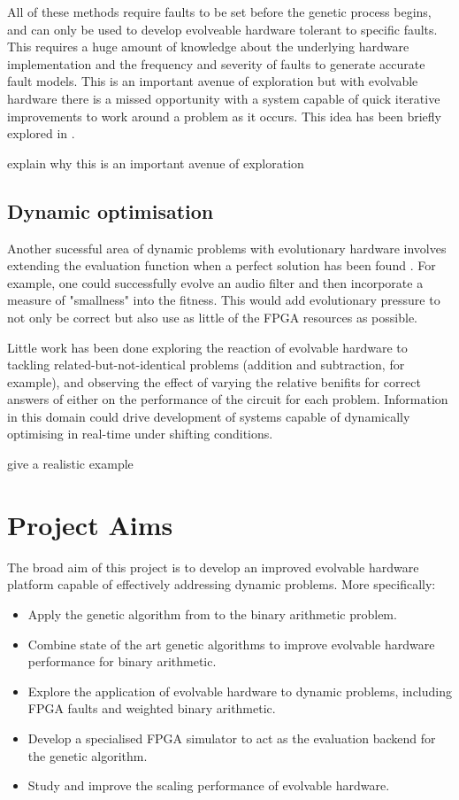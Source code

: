 All of these methods require faults to be set before the genetic process begins, and can only be used to
develop evolveable hardware tolerant to specific faults. This requires a huge amount of knowledge
about the underlying hardware implementation and the frequency and severity of faults to generate
accurate fault models. This
is an important avenue of exploration but with evolvable hardware there is a missed
opportunity with a system capable of quick iterative improvements to work around
a problem as it occurs. This idea has been briefly explored in \cite{10.1007/3-540-61093-6_6}.

\todo explain why this is an important avenue of exploration

\subsection{Dynamic optimisation}
Another sucessful area of dynamic problems with evolutionary hardware involves
extending the evaluation function when a perfect solution has been found \cite{785435}. For example,
one could successfully evolve an audio filter and then incorporate a measure of "smallness"
into the fitness. This would add evolutionary pressure to not only be correct but also
use as little of the FPGA resources as possible.

Little work has been done exploring the reaction of evolvable hardware to tackling
related-but-not-identical problems (addition and subtraction, for example), and observing
the effect of varying
the relative benifits for correct answers of either on the performance of the circuit for each problem.
Information in this domain could
drive development of systems capable of dynamically optimising in real-time
under shifting conditions.

\todo give a realistic example

\section{Project Aims}

The broad aim of this project is to develop an improved evolvable hardware
platform capable of effectively addressing dynamic problems. More specifically:
\begin{itemize}
	\item Apply the genetic algorithm from \cite{10.1007/3-540-63173-9_61} to
		the binary arithmetic problem.
	\item Combine state of the art genetic algorithms to improve
		evolvable hardware performance for binary arithmetic.
	\item Explore the application of evolvable hardware to dynamic
		problems, including FPGA faults and weighted binary arithmetic.
	\item Develop a specialised FPGA simulator to act as the evaluation
		backend for the genetic algorithm.
	\item Study and improve the scaling performance of evolvable hardware.
\end{itemize}

